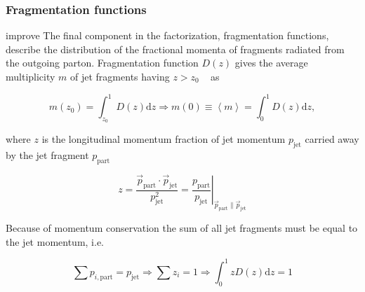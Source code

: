 \subsubsection*{Fragmentation functions}

{\color{red} improve
The final component in the factorization, fragmentation functions, describe the distribution of the fractional momenta of fragments radiated from the outgoing parton. Fragmentation function $D\left(z\right)$ gives the average multiplicity $m$ of jet fragments having $z > z_0$ ~\cite{missing} as 

\begin{equation}
m\left(z_0\right) = \int_{z_0}^1 D\left(z\right) \mathrm{d} z \Rightarrow m\left(0\right) \equiv \left< m \right> = \int_0^1 D\left(z\right) \mathrm{d}z,
\end{equation}

\noindent where $z$ is the longitudinal momentum fraction of jet momentum $p_{\mathrm{jet}}$ carried away by the jet fragment $p_{\mathrm{part}}$



\begin{equation}
z = \frac{\vec p_{\mathrm{part}} \cdot \vec p_{\mathrm{jet}}}{p^2_{\mathrm{jet}}} = \left.\frac{p_{\mathrm{part}}}{p_{\mathrm{jet}}}\right\vert_{\vec{p}_\mathrm{part} \parallel \vec{p}_\mathrm{jet}}
\end{equation}

%

Because of momentum conservation the sum of all jet fragments must be equal to the jet momentum, i.e. 

\begin{equation}
\sum p_{i,\mathrm{part}} = p_\mathrm{jet} \Rightarrow \sum z_i = 1 \Rightarrow \int_0^1 z D\left(z\right) \mathrm{d} z = 1
\end{equation}

%
}
